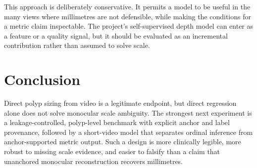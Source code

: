 \documentclass[11pt]{article}
\begin{document}
This approach is deliberately conservative. It permits a model to be useful in
the many views where millimetres are not defensible, while making the conditions
for a metric claim inspectable. The project’s self-supervised depth model can
enter as a feature or a quality signal, but it should be evaluated as an
incremental contribution rather than assumed to solve scale.

\section{Conclusion}

Direct polyp sizing from video is a legitimate endpoint, but direct regression
alone does not solve monocular scale ambiguity. The strongest next experiment
is a leakage-controlled, polyp-level benchmark with explicit anchor and label
provenance, followed by a short-video model that separates ordinal inference
from anchor-supported metric output. Such a design is more clinically legible,
more robust to missing scale evidence, and easier to falsify than a claim that
unanchored monocular reconstruction recovers millimetres.

\begingroup
\scriptsize


\endgroup
\end{document}
